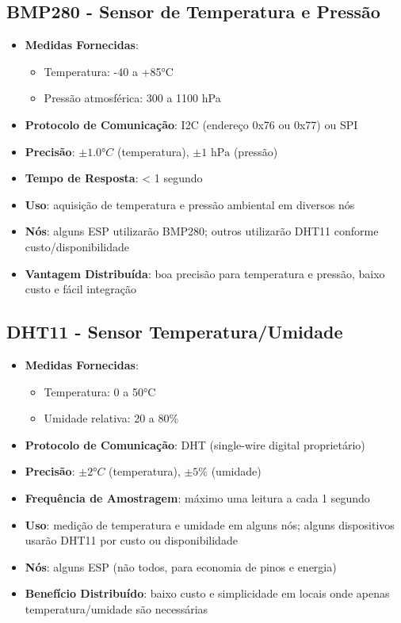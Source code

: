 \documentclass[12pt,a4paper,oneside]{report}
\begin{document}
\subsection{BMP280 - Sensor de Temperatura e Pressão}
\begin{itemize}[leftmargin=1.2cm]
    \item \textbf{Medidas Fornecidas}: 
    \begin{itemize}
        \item Temperatura: -40 a +85°C
        \item Pressão atmosférica: 300 a 1100 hPa
    \end{itemize}
    \item \textbf{Protocolo de Comunicação}: I2C (endereço 0x76 ou 0x77) ou SPI
    \item \textbf{Precisão}: $\pm 1.0°C$ (temperatura), $\pm 1 \text{ hPa}$ (pressão)
    \item \textbf{Tempo de Resposta}: < 1 segundo
    \item \textbf{Uso}: aquisição de temperatura e pressão ambiental em diversos nós
    \item \textbf{Nós}: alguns ESP utilizarão BMP280; outros utilizarão DHT11 conforme custo/disponibilidade
    \item \textbf{Vantagem Distribuída}: boa precisão para temperatura e pressão, baixo custo e fácil integração
\end{itemize}

\subsection{DHT11 - Sensor Temperatura/Umidade}
\begin{itemize}[leftmargin=1.2cm]
    \item \textbf{Medidas Fornecidas}:
    \begin{itemize}
        \item Temperatura: 0 a 50°C
        \item Umidade relativa: 20 a 80\%
    \end{itemize}
    \item \textbf{Protocolo de Comunicação}: DHT (single-wire digital proprietário)
    \item \textbf{Precisão}: $\pm 2°C$ (temperatura), $\pm 5\%$ (umidade)
    \item \textbf{Frequência de Amostragem}: máximo uma leitura a cada 1 segundo
    \item \textbf{Uso}: medição de temperatura e umidade em alguns nós; alguns dispositivos usarão DHT11 por custo ou disponibilidade
    \item \textbf{Nós}: alguns ESP (não todos, para economia de pinos e energia)
    \item \textbf{Benefício Distribuído}: baixo custo e simplicidade em locais onde apenas temperatura/umidade são necessárias
\end{itemize}
\end{document}
